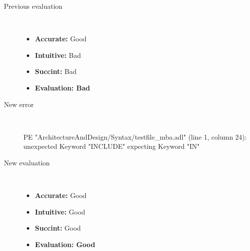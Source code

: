 \begin{description}
\begin{haskell}
\end{haskell}
  \item[Previous evaluation]~\\
    \begin{itemize}
    \item \textbf{Accurate:} Good
    \item \textbf{Intuitive:} Bad
    \item \textbf{Succint:} Bad
    \item \textbf{Evaluation: Bad}
    \end{itemize}
  \item[New error]~\\
\begin{haskell}
PE "ArchitectureAndDesign/Syntax/testfile_mba.adl" (line 1, column 24):
unexpected Keyword "INCLUDE"
expecting Keyword "IN"\end{haskell}
  \item[New evaluation]~\\
    \begin{itemize}
    \item \textbf{Accurate:} Good
    \item \textbf{Intuitive:} Good
    \item \textbf{Succint:} Good
    \item \textbf{Evaluation: Good
}
    \end{itemize}
  \end{description}

\hrulefill

